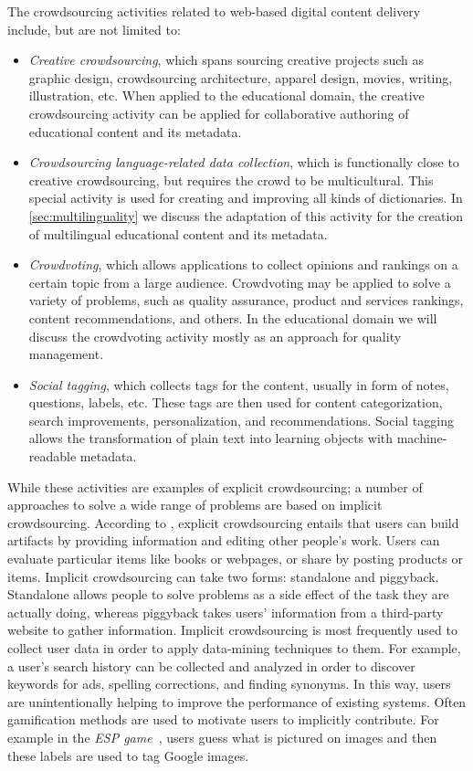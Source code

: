 \documentclass[ngerman,UKenglish,table]{scrbook}
\begin{document}
The crowdsourcing activities related to web-based digital content delivery include, but are not limited to:

\begin{itemize}
\item \emph{Creative crowdsourcing}, which spans sourcing creative projects such as graphic design, crowdsourcing architecture, apparel design, movies, writing, illustration, etc.
When applied to the educational domain, the creative crowdsourcing activity can be applied for collaborative authoring of educational content and its metadata.
\item \emph{Crowdsourcing language-related data collection}, which is functionally close to creative crowdsourcing, but requires the crowd to be multicultural.
This special activity is used for creating and improving all kinds of dictionaries.
In \autoref{sec:multilinguality} we discuss the adaptation of this activity for the creation of multilingual educational content and its metadata.
\item \emph{Crowdvoting}, which allows applications to collect opinions and rankings on a certain topic from a large audience.
Crowdvoting may be applied to solve a variety of problems, such as quality assurance, product and services rankings, content recommendations, and others.
In the educational domain we will discuss the crowdvoting activity mostly as an approach for quality management.
\item \emph{Social tagging}, which collects tags for the content, usually in form of notes, questions, labels,  etc. 
These tags are then used for content categorization, search improvements, personalization, and recommendations.
Social tagging allows the transformation of plain text into learning objects with machine-readable metadata. 
\end{itemize}

While these activities are examples of explicit crowdsourcing; a number of approaches to solve a wide range of problems are based on implicit crowdsourcing.
According to \cite{doan2011crowdsourcing}, explicit crowdsourcing entails that users can build artifacts by providing information and editing other people's work.
Users can evaluate particular items like books or webpages, or share by posting products or items.
Implicit crowdsourcing can take two forms: standalone and piggyback.
Standalone allows people to solve problems as a side effect of the task they are actually doing, whereas piggyback takes users' information from a third-party website to gather information.
Implicit crowdsourcing is most frequently used to collect user data in order to apply data-mining techniques to them.
For example, a user's search history can be collected and analyzed in order to discover keywords for ads, spelling corrections, and finding synonyms.
In this way, users are unintentionally helping to improve the performance of existing systems.
Often gamification methods are used to motivate users to implicitly contribute.
For example in the \emph{ESP game}~\cite{von2004labeling}, users guess what is pictured on images and then these labels are used to tag Google images.
\end{document}
